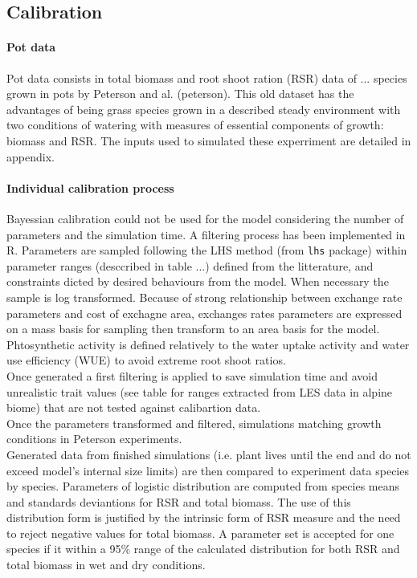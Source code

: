 \documentclass[review]{elsarticle}
\begin{document}
\subsection{Calibration}
\paragraph{Pot data}
Pot data consists in total biomass and root shoot ration (RSR) data of ... species grown in pots by Peterson and al. (peterson). This old dataset has the advantages of being grass species grown in a described steady environment with two conditions of watering with measures of essential components of growth: biomass and RSR. The inputs used to simulated these experriment are detailed in appendix.

\paragraph{Individual calibration process}
Bayessian calibration could not be used for the model considering the number of parameters and the simulation time. A filtering process has been implemented in R. Parameters are sampled following the LHS method (from \texttt{lhs} package)	within parameter ranges (desccribed in table ...) defined from the litterature, and constraints dicted by desired behaviours from the model. When necessary the sample is log transformed. Because of strong relationship between exchange rate parameters and cost of exchagne area, exchanges rates parameters are expressed on a mass basis for sampling then transform to an area basis for the model. Phtosynthetic activity is defined relatively to the water uptake activity and water use efficiency (WUE) to avoid extreme root shoot ratios.\\

Once generated a first filtering is applied to save simulation time and avoid unrealistic trait values (see table for ranges extracted from LES data in alpine biome) that are not tested against calibartion data.\\
Once the parameters transformed and filtered, simulations matching growth conditions in Peterson experiments.\\
Generated data from finished simulations (i.e. plant lives until the end and do not exceed model's internal size limits) are then compared to experiment data species by species. Parameters of logistic distribution are computed from species means and standards deviantions for RSR and total biomass. The use of this distribution form is justified by the intrinsic form of RSR measure and the need to reject negative values for total biomass. A parameter set is accepted for one species if it within a 95\% range of the calculated distribution for both RSR and total biomass in wet and dry conditions.\\
\end{document}
